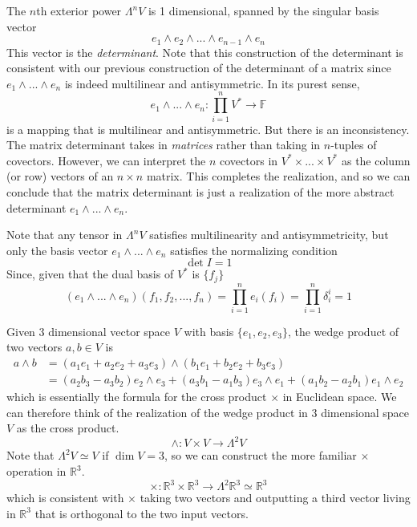 \documentclass{article}
\begin{document}
    \begin{definition}
    The $n$th exterior power $\Lambda^n V$ is 1 dimensional, spanned by the singular basis vector 
    \[e_1 \wedge e_2 \wedge ... \wedge e_{n-1} \wedge e_n\]
    This vector is the \textit{determinant}. Note that this construction of the determinant is consistent with our previous construction of the determinant of a matrix since $e_1 \wedge ... \wedge e_n$ is indeed multilinear and antisymmetric. In its purest sense, 
    \[e_1 \wedge ... \wedge e_n: \prod_{i=1}^n V^* \longrightarrow \mathbb{F}\]
    is a mapping that is multilinear and antisymmetric. But there is an inconsistency. The matrix determinant takes in \textit{matrices} rather than taking in $n$-tuples of covectors. However, we can interpret the $n$ covectors in $V^* \times ... \times V^*$ as the column (or row) vectors of an $n \times n$ matrix. This completes the realization, and so we can conclude that the matrix determinant is just a realization of the more abstract determinant $e_1 \wedge ... \wedge e_n$. 

    Note that any tensor in $\Lambda^n V$ satisfies multilinearity and antisymmetricity, but only the basis vector $e_1 \wedge ... \wedge e_n$ satisfies the normalizing condition
    \[\det{I} = 1\]
    Since, given that the dual basis of $V^*$ is $\{f_j\}$
    \[(e_1 \wedge ... \wedge e_n) (f_1, f_2, ..., f_n) = \prod_{i=1}^n e_i (f_i) = \prod_{i=1}^n \delta_i^i = 1\]
    \end{definition}

    \begin{example}
    Given 3 dimensional vector space $V$ with basis $\{e_1, e_2, e_3\}$, the wedge product of two vectors $a, b \in V$ is 
    \begin{align*}
        a \wedge b & = (a_1 e_1 + a_2 e_2 + a_3 e_3) \wedge (b_1 e_1 + b_2 e_2 + b_3 e_3) \\
        & = (a_2 b_3 - a_3 b_2) e_2 \wedge e_3 + (a_3 b_1 - a_1 b_3) e_3 \wedge e_1 + (a_1 b_2 - a_2 b_1) e_1 \wedge e_2 
    \end{align*}
    which is essentially the formula for the cross product $\times$ in Euclidean space. We can therefore think of the realization of the wedge product in 3 dimensional space $V$ as the cross product. 
    \[\wedge: V \times V \longrightarrow \Lambda^2 V\]
    Note that $\Lambda^2 V \simeq V$ if $\dim{V} = 3$, so we can construct the more familiar $\times$ operation in $\mathbb{R}^3$. 
    \[\times: \mathbb{R}^3 \times \mathbb{R}^3 \longrightarrow \Lambda^2 \mathbb{R}^3 \simeq \mathbb{R}^3\]
    which is consistent with $\times$ taking two vectors and outputting a third vector living in $\mathbb{R}^3$ that is orthogonal to the two input vectors. 
    \end{example}
\end{document}
